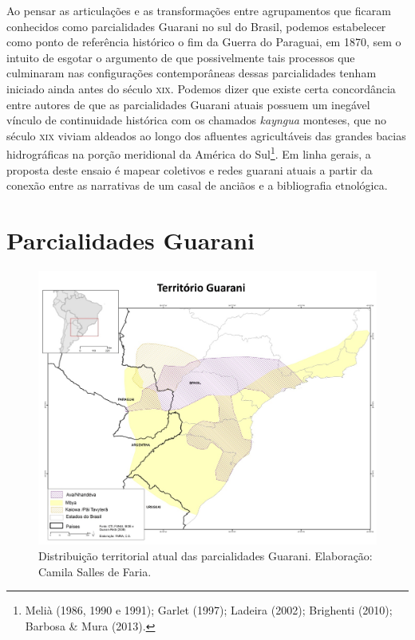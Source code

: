 \noindent
Ao pensar as articulações e as transformações entre agrupamentos que
ficaram conhecidos como parcialidades Guarani no sul do Brasil, podemos
estabelecer como ponto de referência histórico o fim da Guerra do
Paraguai, em 1870, sem o intuito de esgotar o argumento de que
possivelmente tais processos que culminaram nas configurações
contemporâneas dessas parcialidades tenham iniciado ainda antes do
século \textsc{xix}. Podemos dizer que existe certa concordância entre autores
de que as parcialidades Guarani atuais possuem um inegável vínculo de
continuidade histórica com os chamados \emph{kayngua} monteses, que no século
\textsc{xix} viviam aldeados ao longo dos afluentes agricultáveis das grandes
bacias hidrográficas na porção meridional da América do
Sul\footnote{Melià (1986, 1990 e 1991); Garlet (1997); Ladeira (2002);
Brighenti (2010); Barbosa \& Mura (2013).}. Em linha gerais, a proposta
deste ensaio é mapear coletivos e redes guarani atuais a partir da
conexão entre as narrativas de um casal de anciãos e a bibliografia
etnológica. 

\section{Parcialidades Guarani}

\begin{figure}
  \centering
 \includegraphics[width=\textwidth]{./img/GUARANIS-img7.jpg}	
  \hfill
  \caption{Distribuição territorial atual das parcialidades Guarani. Elaboração: Camila Salles de Faria.}
\end{figure}

